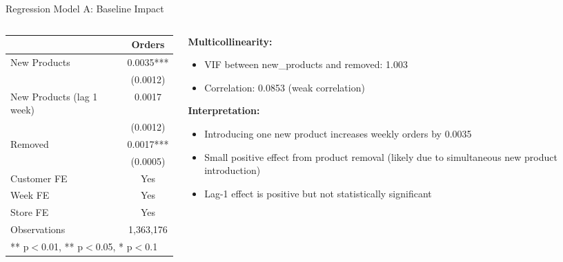 \documentclass[aspectratio=169]{beamer}  %
\begin{document}
\begin{frame}{Regression Model A: Baseline Impact}
\begin{columns}
\begin{column}{0.5\linewidth}
    \begin{table}[h]
    \centering
    \scriptsize
    \begin{tabular}{lc}
    \toprule
     & \textbf{Orders} \\
    \midrule
    New Products & 0.0035*** \\
     & (0.0012) \\
    New Products (lag 1 week) & 0.0017 \\
     & (0.0012) \\
    Removed & 0.0017*** \\
     & (0.0005) \\
    \midrule
    Customer FE & Yes \\
    Week FE & Yes \\
    Store FE & Yes \\
    \midrule
    Observations & 1,363,176 \\
    \bottomrule
    \multicolumn{2}{l}{\scriptsize *** p$<$0.01, ** p$<$0.05, * p$<$0.1} \\
    \end{tabular}
    \end{table}
\end{column}
\begin{column}{0.5\linewidth}
    \textbf{Multicollinearity:}
    \begin{itemize}
        \item VIF between new\_products and removed: 1.003
        \item Correlation: 0.0853 (weak correlation)
    \end{itemize}
    \textbf{Interpretation:}
    \begin{itemize}
        \item Introducing one new product increases weekly orders by 0.0035
        \item Small positive effect from product removal (likely due to simultaneous new product introduction)
        \item Lag-1 effect is positive but not statistically significant
    \end{itemize}
\end{column}
\end{columns}    
\end{frame}
\end{document}
